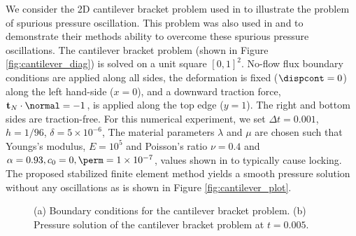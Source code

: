 We consider the 2D cantilever bracket problem used in \cite{phillips2009overcoming} to illustrate the problem of spurious pressure oscillation. This problem was also used in \cite{mear2004discontinuous} and \cite{yi2013coupling} to demonstrate their methods ability to overcome these spurious pressure oscillations. The cantilever bracket problem (shown in Figure \ref{fig:cantilever_diag}) is solved on a unit square $[0,1]^{2}$. No-flow flux boundary conditions are applied along all sides, the deformation is fixed ($\dispcont=0$) along the left hand-side (${x}=0$), and a downward traction force, $\mathbf{t}_{N}\cdot \normal =-1$, is applied along the top edge ($y = 1$). The right and bottom sides are traction-free. For this numerical experiment, we set $\Delta t = 0.001$, $h=1/96$, $\delta=5\times 10^{-6}$, The material parameters $\lambda$ and $\mu$ are chosen such that Youngs's modulus, $E=10^{5}$ and Poisson's ratio $ \nu=0.4$ and $\alpha=0.93, c_{0}=0, \perm =1\times 10^{-7}$, values shown in  \cite{phillips2009overcoming} to typically cause locking. The proposed stabilized finite element method yields a smooth pressure solution without any oscillations as is shown in Figure \ref{fig:cantilever_plot}.
\begin{figure}[h]
\label{fig:cantilever}
  \centering
\caption{(a) Boundary conditions for the cantilever bracket problem. (b) Pressure solution of the cantilever bracket problem at $t=0.005$.}
\end{figure}

